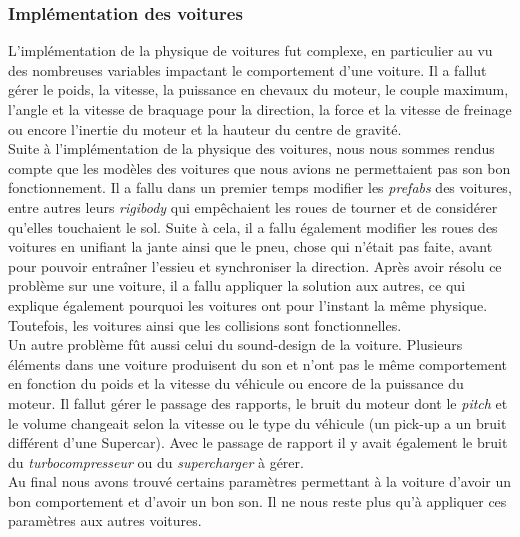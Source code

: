\documentclass[a4paper,12pt]{article}
\begin{document}
            \subsubsection{Implémentation des voitures}
                L'implémentation de la physique de voitures fut complexe, en particulier au vu des 
                nombreuses variables impactant le comportement d'une voiture. Il a fallut gérer le 
                poids, la vitesse, la puissance en chevaux du moteur, le couple maximum, l'angle et la 
                vitesse de braquage pour la direction, la force et la vitesse de freinage ou encore 
                l'inertie du moteur et la hauteur du centre de gravité.\\
                Suite à l'implémentation de la physique des voitures, nous nous sommes rendus compte que 
                les modèles des voitures que nous avions ne permettaient pas son bon fonctionnement. Il 
                a fallu dans un premier temps modifier les \textit{prefabs} des voitures, entre autres 
                leurs \textit{rigibody} qui empêchaient les roues de tourner et de considérer qu'elles 
                touchaient le sol. Suite à cela, il a fallu également modifier les roues des voitures en
                unifiant la jante ainsi que le pneu, chose qui n'était pas faite, avant pour pouvoir 
                entraîner l'essieu et synchroniser la direction. Après avoir résolu ce problème sur une 
                voiture, il a fallu appliquer la solution aux autres, ce qui explique également pourquoi les 
                voitures ont pour l'instant la même physique. Toutefois, les voitures ainsi que les 
                collisions sont fonctionnelles.\\
                Un autre problème fût aussi celui du sound-design de la voiture. Plusieurs éléments dans
                une voiture produisent du son et n'ont pas le même comportement en fonction du poids et
                la vitesse du véhicule ou encore de la puissance du moteur. Il fallut gérer le passage
                des rapports, le bruit du moteur dont le \textit{pitch} et le volume changeait selon la
                vitesse ou le type du véhicule (un pick-up a un bruit différent d'une Supercar). Avec le
                passage de rapport il y avait également le bruit du \textsl{turbocompresseur} ou du
                \textsl{supercharger} à gérer.\\
                Au final nous avons trouvé certains paramètres permettant à la voiture d'avoir un bon
                comportement et d'avoir un bon son. Il ne nous reste plus qu'à appliquer ces paramètres
                aux autres voitures.
        
\end{document}
